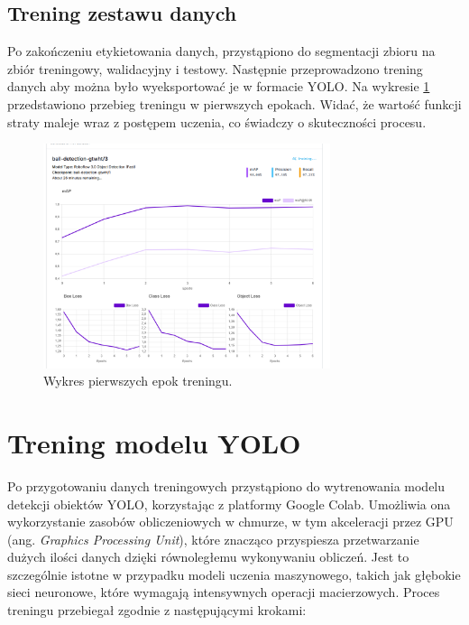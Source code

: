 \documentclass[a4paper,twoside,12pt]{book}
\begin{document}
\subsection{Trening zestawu danych}
Po zakończeniu etykietowania danych, przystąpiono do segmentacji zbioru na zbiór treningowy, walidacyjny i testowy.
Następnie przeprowadzono trening danych aby można było wyeksportować je w formacie YOLO.
Na wykresie \ref{fig:Wykrespoczatek} przedstawiono przebieg treningu w pierwszych epokach. Widać, że wartość funkcji straty maleje wraz z postępem uczenia, co świadczy o skuteczności procesu.

\begin{figure}[h]
    \centering
    \includegraphics[width=0.75\textwidth]{Images/Roboflow/poczatek uczenia.png}
    \caption{Wykres pierwszych epok treningu.}
    \label{fig:Wykrespoczatek}
\end{figure}

\newpage

\section{Trening modelu YOLO}

Po przygotowaniu danych treningowych przystąpiono do wytrenowania modelu detekcji obiektów YOLO, korzystając z platformy Google Colab. Umożliwia ona wykorzystanie zasobów obliczeniowych w chmurze, w tym akceleracji przez GPU (ang. \textit{Graphics Processing Unit}), które znacząco przyspiesza przetwarzanie dużych ilości danych dzięki równoległemu wykonywaniu obliczeń. Jest to szczególnie istotne w przypadku modeli uczenia maszynowego, takich jak głębokie sieci neuronowe, które wymagają intensywnych operacji macierzowych. Proces treningu przebiegał zgodnie z następującymi krokami:
\end{document}
